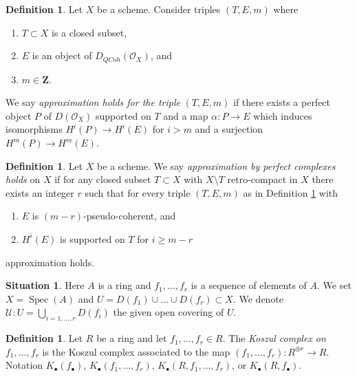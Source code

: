 \documentclass{amsart}
\theoremstyle{plain}
\theoremstyle{definition}
\newtheorem{definition}[subsection]{Definition}
\newtheorem{situation}[subsection]{Situation}
\theoremstyle{remark}
\numberwithin{equation}{subsection}
\def\Spec{\mathop{\mathrm{Spec}}}
\def\QCoh{\mathit{QCoh}}
\begin{document}
\begin{definition}
\label{definition-approximation-holds}
Let $X$ be a scheme. Consider triples $(T, E, m)$ where
\begin{enumerate}
\item $T \subset X$ is a closed subset,
\item $E$ is an object of $D_\QCoh(\mathcal{O}_X)$, and
\item $m \in \mathbf{Z}$.
\end{enumerate}
We say {\it approximation holds for the triple} $(T, E, m)$ if
there exists a perfect object $P$ of $D(\mathcal{O}_X)$ supported on $T$
and a map $\alpha : P \to E$ which induces isomorphisms $H^i(P) \to H^i(E)$
for $i > m$ and a surjection $H^m(P) \to H^m(E)$.
\end{definition}

\begin{definition}
\label{definition-approximation}
Let $X$ be a scheme. We say {\it approximation by perfect complexes holds}
on $X$ if for any closed subset $T \subset X$ with $X \setminus T$
retro-compact in $X$ there exists an integer $r$ such that
for every triple $(T, E, m)$ as in
Definition \ref{definition-approximation-holds} with
\begin{enumerate}
\item $E$ is $(m - r)$-pseudo-coherent, and
\item $H^i(E)$ is supported on $T$ for $i \geq m - r$
\end{enumerate}
approximation holds.
\end{definition}

\begin{situation}
\label{situation-complex}
Here $A$ is a ring and $f_1, \ldots, f_r$ is a sequence of elements of $A$.
We set $X = \Spec(A)$ and $U = D(f_1) \cup \ldots \cup D(f_r) \subset X$.
We denote $\mathcal{U} : U = \bigcup_{i = 1, \ldots, r} D(f_i)$ the
given open covering of $U$.
\end{situation}

\begin{definition}
\label{more-algebra-definition-koszul-complex}
Let $R$ be a ring and let $f_1, \ldots, f_r \in R$. The
{\it Koszul complex on $f_1, \ldots, f_r$} is the Koszul complex
associated to the map $(f_1, \ldots, f_r) : R^{\oplus r} \to R$.
Notation $K_\bullet(f_\bullet)$, $K_\bullet(f_1, \ldots, f_r)$,
$K_\bullet(R, f_1, \ldots, f_r)$, or $K_\bullet(R, f_\bullet)$.
\end{definition}
\end{document}
